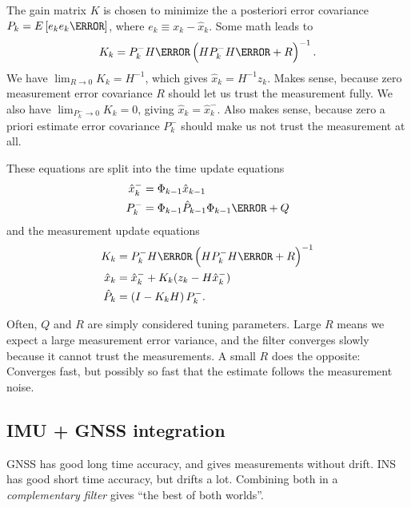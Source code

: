 The gain matrix $K$ is chosen to minimize the a posteriori error covariance $P_k = E \left[ e_k e_k\T \right]$, where $e_k \equiv x_k - \hat{x}_k$. Some math leads to
\begin{equation}
	K_k = P_k^- H\T \left( H P_k^- H\T + R \right)^{-1}.
\end{equation}
We have $\lim_{R \rightarrow 0} K_k = H^{-1}$, which gives $\hat{x}_k = H^{-1} z_k$. Makes sense, because zero measurement error covariance $R$ should let us trust the measurement fully. We also have $\lim_{P_k^- \rightarrow 0} K_k = 0$, giving $\hat{x}_k = \hat{x}_k^-$. Also makes sense, because zero a priori estimate error covariance $P_k^-$ should make us not trust the measurement at all.

These equations are split into the time update equations
\begin{equation}
\begin{split}
	\hat{x}_k^- &= \Phi_{k-1} \hat{x}_{k-1} \\
	P_k^-       &= \Phi_{k-1} \hat{P}_{k-1} \Phi_{k-1}\T + Q
\end{split}
\end{equation}
and the measurement update equations
\begin{equation}
\begin{split}
	K_k       &= P_k^- H\T \left( H P_k^- H\T + R \right)^{-1} \\
	\hat{x}_k &= \hat{x}_k^- + K_k(z_k - H \hat{x}_k^-) \\
	\hat{P}_k       &= \left( I - K_k H \right) P_k^-.
\end{split}
\end{equation}

Often, $Q$ and $R$ are simply considered tuning parameters. Large $R$ means we expect a large measurement error variance, and the filter converges slowly because it cannot trust the measurements. A small $R$ does the opposite: Converges fast, but possibly so fast that the estimate follows the measurement noise.

\subsection{IMU + GNSS integration}

GNSS has good long time accuracy, and gives measurements without drift. INS has good short time accuracy, but drifts a lot. Combining both in a \emph{complementary filter} gives ``the best of both worlds''.
